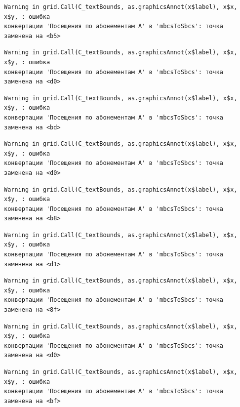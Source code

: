 \documentclass[
  letterpaper,
  DIV=11,
  numbers=noendperiod]{scrreprt}
\begin{document}
\begin{verbatim}
Warning in grid.Call(C_textBounds, as.graphicsAnnot(x$label), x$x, x$y, : ошибка
конвертации 'Посещения по абонементам А' в 'mbcsToSbcs': точка заменена на <b5>
\end{verbatim}

\begin{verbatim}
Warning in grid.Call(C_textBounds, as.graphicsAnnot(x$label), x$x, x$y, : ошибка
конвертации 'Посещения по абонементам А' в 'mbcsToSbcs': точка заменена на <d0>
\end{verbatim}

\begin{verbatim}
Warning in grid.Call(C_textBounds, as.graphicsAnnot(x$label), x$x, x$y, : ошибка
конвертации 'Посещения по абонементам А' в 'mbcsToSbcs': точка заменена на <bd>
\end{verbatim}

\begin{verbatim}
Warning in grid.Call(C_textBounds, as.graphicsAnnot(x$label), x$x, x$y, : ошибка
конвертации 'Посещения по абонементам А' в 'mbcsToSbcs': точка заменена на <d0>
\end{verbatim}

\begin{verbatim}
Warning in grid.Call(C_textBounds, as.graphicsAnnot(x$label), x$x, x$y, : ошибка
конвертации 'Посещения по абонементам А' в 'mbcsToSbcs': точка заменена на <b8>
\end{verbatim}

\begin{verbatim}
Warning in grid.Call(C_textBounds, as.graphicsAnnot(x$label), x$x, x$y, : ошибка
конвертации 'Посещения по абонементам А' в 'mbcsToSbcs': точка заменена на <d1>
\end{verbatim}

\begin{verbatim}
Warning in grid.Call(C_textBounds, as.graphicsAnnot(x$label), x$x, x$y, : ошибка
конвертации 'Посещения по абонементам А' в 'mbcsToSbcs': точка заменена на <8f>
\end{verbatim}

\begin{verbatim}
Warning in grid.Call(C_textBounds, as.graphicsAnnot(x$label), x$x, x$y, : ошибка
конвертации 'Посещения по абонементам А' в 'mbcsToSbcs': точка заменена на <d0>
\end{verbatim}

\begin{verbatim}
Warning in grid.Call(C_textBounds, as.graphicsAnnot(x$label), x$x, x$y, : ошибка
конвертации 'Посещения по абонементам А' в 'mbcsToSbcs': точка заменена на <bf>
\end{verbatim}
\end{document}
